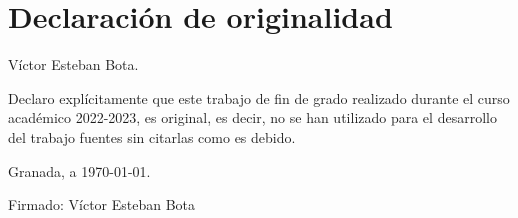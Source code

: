 

\chapter*{Declaración de originalidad}

Víctor Esteban Bota.

Declaro explícitamente que este trabajo de fin de grado realizado durante el curso académico 2022-2023, es original, es decir, no se han utilizado para el desarrollo del trabajo fuentes sin citarlas como es debido.

Granada, a \today.

Firmado: Víctor Esteban Bota